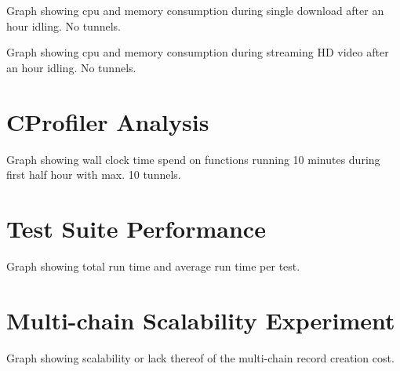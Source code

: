 \documentclass[]{report}
\begin{document}
Graph showing cpu and memory consumption during single download after an hour idling. No tunnels.

Graph showing cpu and memory consumption during streaming HD video after an hour idling. No tunnels.


\section{CProfiler Analysis}
Graph showing wall clock time spend on functions running 10 minutes during first half hour with max. 10 tunnels.


\section{Test Suite Performance}
Graph showing total run time and average run time per test.


\section{Multi-chain Scalability Experiment}
Graph showing scalability or lack thereof of the multi-chain record creation cost.
\end{document}
